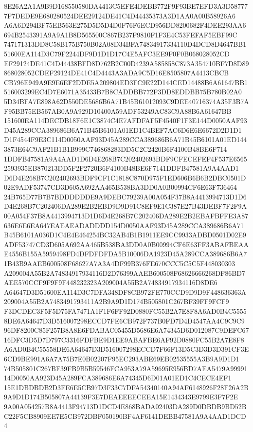 \documentclass[UTF8,fontset=fandol,zihao=-4,a4paper]{ctexart}
\begin{document}
{{8E26A2A1A9B9D168550580DA4413C5EFE4DEBB772F9F93BE7EFD3A3D587777F7DEDE9E680280524DEE29124DE41C4D44435373A3D1AA0A00B58926A6
A6A6D294BF75EB563E275D5D5D4D0F76F6ECD956DD8200682F4DEE293AA6694B2543391A9A9A1B8D565500C867B237F9810F1F3E4C53FEFAF5EBF99C
747171313DD8C58B175B750B02A08D34BFA74834917334110D4DCD8D4647BB151600EA114D3C79F2244DF9D1D1D17C4E5AFC3EE9F0F0B068028052CD
EF29124DE41C4D44438BFD8D762B2C00D4239A585858C873A354710BF7D8D89868028052CDEF29124DE41C4D4443A3ADA9C5D16E8505807A4413CBCB
CB796E949A9E9E6EF2DDE5A209804ED3FC9E22D144CED14488B6A61647BB1516003299EC4D7E6071A35433B7B8CADDBB772F3DD8EDDBB75B780B02A0
5D34BFA7E898A62D550DE5686B6A71B45B61012093C9DEE40716374A35F3B7AF95BB75EB567AB0A9A929D10400A59ADF53249AC83C9A88B6A61647BB
151600EA114DECDB18F6E1C3874C4E7AFDFAF5F4540F1F3E144D0050AAF93D45A289CCA389686B6A71B45B6101A01ED1C4BEF7AC6D6E6E6672D2D1D1
D1F4544F9E3C114D0050AAF93D45A289CCA389686B6A71B45B6101A01ED1443873E64C9AF21B1B1B999C746868283DD5C2C2420B6F4100B48BE6F714
1DDFB47581A9A4AAD1D6D4E268B7C202402693BDF9CFECEFEF4F537E65652593935EB870213DD5F2F2720B6F4100B48BE6F7141DDFB47581A9A4AAD1
D6D4E268B7C202402693BDF9CF1C1818C870D975F1ED606B6B6B2DBC0501D02E9ADF53747CD3D605A692AA465B538BA3DD0A0B00994CF6E63F736464
24B765D77B7B7BDDDDDDE9A9DEBC79239A00A054F37B8A4413994713D1D6D4E268B7C202406DA289E2B2EBD9D9D91C8EF9E1C387E27B43DEBF7F2F9A
00A054F37B8A4413994713D1D6D4E268B7C202406DA289E2B2EBAFBFFE3A87636E6E6EA647EAEAEADADDDD154D0050AAF93D45A289CCA389686B6A71
B45B6101A036D1C4E4E464254BC32AB4B1B1911EE9CC9933ADBD0501D02E9ADF53747CD3D605A692AA465B538BA3DD0A0B00994CF6E63FF3ABAFBEAA
E4556B155A5959498FD4DFDFDFDA5B10006DA1923D45A289CCA389686B6A71B43B9AAEB600508F68627A7A3A4DF99B376FE670CCC5C5C5F448030303
A209004A55B2A74834917934116D2D76399AAEB600508F68626666268DF86BD7AEE570CCF9F9F9F448232323A209004A55B2A74834917934116D8DE6
A64647D3D51600EA114D3C7DFA348DF8CB972FE770CCD9D9D9F448636363A209004A55B2A7483491793411A2B9A9D1D174B505801C267BF39FF9FCF9
F3DCDEC3F5F5D75FA7471A1F1F6FF92D0880FC55B2A7E8F8A6AD0B4C55558DE6A64647D3D516007298ECCD7FE6CB972F737B0FD7D4D4547AA4C9C9C9
96DF8200C85F257B8A8E6FDABAC05455D5686E6A74345D6D012087C9DEFC6716DFC3D5D7D797C3316FDFBE9D1EE9ABAFBE6AF92D0880FC55B2A7E8F8
A6AD0B4C55558DE6A64647D3D516007298ECCD7F66F13D5C3D3D3D391CF3E6CD9BE991A6A7A75B7E0B02207F95EC293ABE69EB02535555A3B9A9D1D1
74B505801C267BF39FB9B5B59546FCA953A79A59695E956BD7AEA5479A9999114D0050AA923D45A289FCA389686E6A74345D6D01A01ED1C4CECE4EF1
15E1DBDBDB2D3FE6E5CB97D3F33C7DFA54340140A94AF6148926F28F26A2B9A9D1D174B505807A44139F3E7DEAEEEECEEA15E1434343E9799E3F7F2E
9A00A054257B8A4413F94713D1DCD4E868BADA02403DA289D0DBDB9BD52BC22F5CB8909EE7E5CB972DBF050190BF4AF6141DEBB47581A9A4AAD1DCD4
}}
\end{document}
